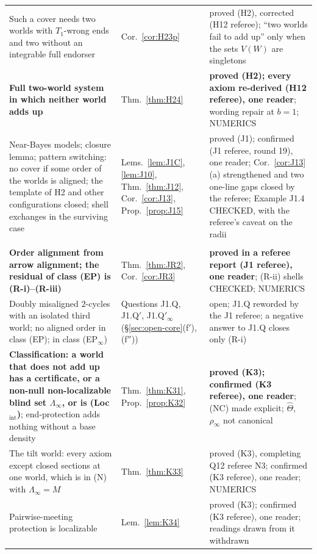 \documentclass[11pt]{article}
\theoremstyle{definition}
\theoremstyle{remark}
\begin{document}
{\begin{longtable}{>{\raggedright\arraybackslash}p{6.4cm}>{\raggedright\arraybackslash}p{2.1cm}>{\raggedright\arraybackslash}p{5.6cm}}
Such a cover needs two worlds with $T_1$-wrong ends and two without an integrable full endorser & Cor.~\ref{cor:H23p} & proved (H2), corrected (H12 referee); ``two worlds fail to add up'' only when the sets $V(W)$ are singletons\\
\textbf{Full two-world system in which neither world adds up} & Thm.~\ref{thm:H24} & \textbf{proved (H2); every axiom re-derived (H12 referee), one reader}; wording repair at $b=1$; NUMERICS\\
Near-Bayes models; closure lemma; pattern switching: no cover if some order of the worlds is aligned; the template of H2 and other configurations closed; shell exchanges in the surviving case & Lems.~\ref{lem:J1C}, \ref{lem:J10}, Thm.~\ref{thm:J12}, Cor.~\ref{cor:J13}, Prop.~\ref{prop:J15} & proved (J1); confirmed (J1 referee, round 19), one reader; Cor.~\ref{cor:J13}(a) strengthened and two one-line gaps closed by the referee; Example J1.4 CHECKED, with the referee's caveat on the radii\\
\multicolumn{3}{l}{\emph{Round 19} (\S\ref{sec:open-core}(f$'$)--(g); notes K1--K3, each refereed once; J1 referee)}\\
\textbf{Order alignment from arrow alignment; the residual of class (EP) is (R-i)--(R-iii)} & Thm.~\ref{thm:JR2}, Cor.~\ref{cor:JR3} & \textbf{proved in a referee report (J1 referee), one reader}; (R-ii) shells CHECKED; NUMERICS\\
Doubly misaligned $2$-cycles with an isolated third world; no aligned order in class (EP); in class (EP$_\infty$) & Questions J1.Q, J1.Q$'$, J1.Q$'_\infty$ (\S\ref{sec:open-core}(f$'$), (f$''$)) & open; J1.Q reworded by the J1 referee; a negative answer to J1.Q closes only (R-i)\\
\textbf{Classification: a world that does not add up has a certificate, or a non-null non-localizable blind set $\Lambda_\infty$, or is (Loc$_{\mathrm{int}}$)}; end-protection adds nothing without a base density & Thm.~\ref{thm:K31}, Prop.~\ref{prop:K32} & \textbf{proved (K3); confirmed (K3 referee), one reader}; (NC) made explicit; $\hat\Theta$, $\rho_\infty$ not canonical\\
The tilt world: every axiom except closed sections at one world, which is in (N) with $\Lambda_\infty=M$ & Thm.~\ref{thm:K33} & proved (K3), completing Q12 referee N3; confirmed (K3 referee), one reader; NUMERICS\\
Pairwise-meeting protection is localizable & Lem.~\ref{lem:K34} & proved (K3); confirmed (K3 referee), one reader; readings drawn from it withdrawn\\

\end{longtable}}
\end{document}
